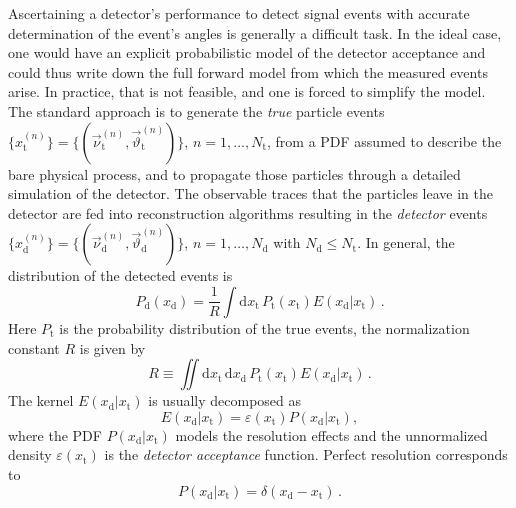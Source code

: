 \documentclass[aps,nofootinbib,preprintnumbers,prd,twocolumn]{revtex4-1}
\newcommand{\rmdx}[1]{\mbox{d} #1 \,} %
\newcommand{\subd}{_{\text{d}}}
\newcommand{\subt}{_{\text{t}}}
\renewcommand{\theta}{\vartheta}
\let\eps\varepsilon
\newcommand{\xd}{x\subd}
\newcommand{\xt}{x\subt}
\newcommand{\Ekernel}{E(\xd|\xt)}
\begin{document}
Ascertaining a detector's performance to detect signal events
with accurate determination of the event's angles is generally a
difficult task. In the ideal case, one would have an explicit
probabilistic model of the detector acceptance and could thus
write down the full forward model from which the measured events
arise. In practice, that is not feasible, and one is
forced to simplify the model.
The standard approach is to generate the \emph{true} particle events
$\lbrace x_\text{t}^{(n)}\rbrace =
\lbrace(\vec{\nu}^{(n)}_\text{t},\vec\theta^{(n)}_\text{t})\rbrace$,
$n=1,\dots,N_\text{t}$, from a PDF assumed to describe the bare
physical process, and to propagate those particles through a detailed
simulation of the detector.  The observable traces that the particles
leave in the detector are fed into reconstruction algorithms resulting
in the \emph{detector} events $\lbrace x^{(n)}_\text{d}\rbrace =
\lbrace(\vec{\nu}^{(n)}_\text{d}, \vec\theta^{(n)}_\text{d})\rbrace$,
$n=1,\dots,N_\text{d}$ with $N_\text{d} \le N_\text{t}$.  In general,
the distribution of the detected events is
\begin{equation}
    P_\text{d}(x_\text{d}) = \frac{1}{R} \int \rmdx{x_\text{t}} P_\text{t}(x_\text{t}) E(x_\text{d} | x_\text{t}) \,.
\end{equation}
Here $P_\text{t}$ is the probability distribution of the true events,
the normalization constant $R$ is given by
\begin{equation}
  \label{eq:def-R}
    R \equiv \iint \rmdx{x_\text{t}} \rmdx{x_\text{d}} P_\text{t}(x_\text{t}) E(x_\text{d} | x_\text{t})\,.
\end{equation}
The kernel $E(x_\text{d}| x_\text{t})$ is usually decomposed as
\begin{equation}
  \Ekernel = \eps(\xt) P(\xd|\xt),
\end{equation}
where the PDF $P(\xd|\xt)$ models the resolution effects and the
unnormalized density $\eps(\xt)$ is the \emph{detector acceptance}
function. Perfect resolution corresponds to
\begin{equation}
  P(\xd|\xt) = \delta(\xd - \xt) \,.
\end{equation}
\end{document}
